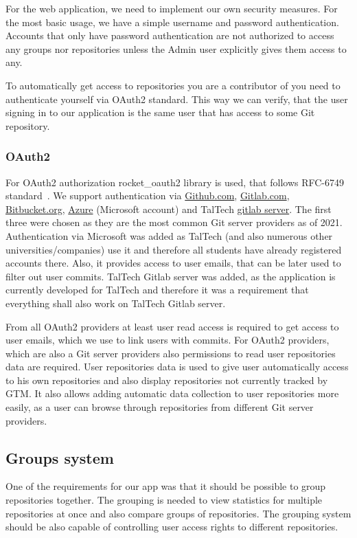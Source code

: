 For the web application, we need to implement our own security measures.
For the most basic usage, we have a simple username and password authentication.
Accounts that only have password authentication are not authorized to access any groups nor repositories unless the Admin user
explicitly gives them access to any.

To automatically get access to repositories you are a contributor of you need to authenticate yourself via OAuth2 standard.
This way we can verify, that the user signing in to our application is the same user that has access to some Git repository.

\subsubsection{OAuth2}\label{subsubsec:oauth2}
For OAuth2 authorization rocket{\_}oauth2 library is used, that follows RFC-6749 standard~\cite{rocket-oauth2, oauth2}.
We support authentication via \href{https://github.com/}{Github.com}, \href{https://about.gitlab.com/}{Gitlab.com},
\href{https://bitbucket.org/}{Bitbucket.org}, \href{https://azure.microsoft.com/}{Azure} (Microsoft account) and
TalTech \href{https://gitlab.cs.ttu.ee/}{gitlab server}.
The first three were chosen as they are the most common Git server providers as of 2021.
Authentication via Microsoft was added as TalTech (and also numerous other universities/companies) use it and therefore
all students have already registered accounts there.
Also, it provides access to user emails, that can be later used to filter out user commits.
TalTech Gitlab server was added, as the application is currently developed for TalTech and therefore it was a requirement
that everything shall also work on TalTech Gitlab server.

From all OAuth2 providers at least user read access is required to get access to user emails, which we use to link users with commits.
For OAuth2 providers, which are also a Git server providers also permissions to read user repositories data are required.
User repositories data is used to give user automatically access to his own repositories and also display repositories
not currently tracked by GTM.
It also allows adding automatic data collection to user repositories more easily, as a user can browse through
repositories from different Git server providers.

\subsection{Groups system}\label{subsec:group-system}
One of the requirements for our app was that it should be possible to group repositories together.
The grouping is needed to view statistics for multiple repositories at once and also compare groups of repositories.
The grouping system should be also capable of controlling user access rights to different repositories.

